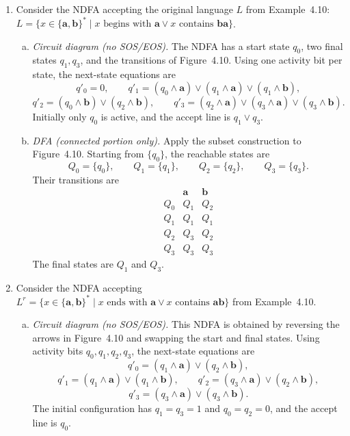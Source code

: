 \begin{enumerate}[{4.}1.]
\item Consider the NDFA accepting the original language $L$ from Example~4.10:
$L=\{x\in\{\pmb{a},\pmb{b}\}^*\mid x\text{ begins with }\pmb{a}\vee x\text{ contains }\pmb{ba}\}$.

\begin{enumerate}[(a)]
  \item \emph{Circuit diagram (no SOS/EOS).}  The NDFA has a start state
  $q_0$, two final states $q_1,q_3$, and the transitions of Figure~4.10.
  Using one activity bit per state, the next-state equations are
  \[
    q'_0=0,\qquad
    q'_1=(q_0\wedge \pmb{a})\vee(q_1\wedge \pmb{a})\vee(q_1\wedge \pmb{b}),
  \]
  \[
    q'_2=(q_0\wedge \pmb{b})\vee(q_2\wedge \pmb{b}),\qquad
    q'_3=(q_2\wedge \pmb{a})\vee(q_3\wedge \pmb{a})\vee(q_3\wedge \pmb{b}).
  \]
  Initially only $q_0$ is active, and the accept line is $q_1\vee q_3$.

  \item \emph{DFA (connected portion only).}  Apply the subset construction
  to Figure~4.10.  Starting from $\{q_0\}$, the reachable states are
  \[
    Q_0=\{q_0\},\qquad Q_1=\{q_1\},\qquad Q_2=\{q_2\},\qquad Q_3=\{q_3\}.
  \]
  Their transitions are
  \[
  \begin{array}{c|cc}
   & \pmb{a} & \pmb{b}\\\hline
  Q_0 & Q_1 & Q_2\\
  Q_1 & Q_1 & Q_1\\
  Q_2 & Q_3 & Q_2\\
  Q_3 & Q_3 & Q_3
  \end{array}
  \]
  The final states are $Q_1$ and $Q_3$.
\end{enumerate}

\item Consider the NDFA accepting $L^r=\{x\in\{\pmb{a},\pmb{b}\}^*\mid x\text{ ends with }\pmb{a}\vee x\text{ contains }\pmb{ab}\}$ from Example~4.10.

\begin{enumerate}[(a)]
  \item \emph{Circuit diagram (no SOS/EOS).}  This NDFA is obtained by
  reversing the arrows in Figure~4.10 and swapping the start and final
  states.  Using activity bits $q_0,q_1,q_2,q_3$, the next-state equations are
  \[
    q'_0=(q_1\wedge \pmb{a})\vee(q_2\wedge \pmb{b}),
  \]
  \[
    q'_1=(q_1\wedge \pmb{a})\vee(q_1\wedge \pmb{b}),\qquad
    q'_2=(q_3\wedge \pmb{a})\vee(q_2\wedge \pmb{b}),
  \]
  \[
    q'_3=(q_3\wedge \pmb{a})\vee(q_3\wedge \pmb{b}).
  \]
  The initial configuration has $q_1=q_3=1$ and $q_0=q_2=0$, and the accept
  line is $q_0$.


\end{enumerate}
\end{enumerate}
